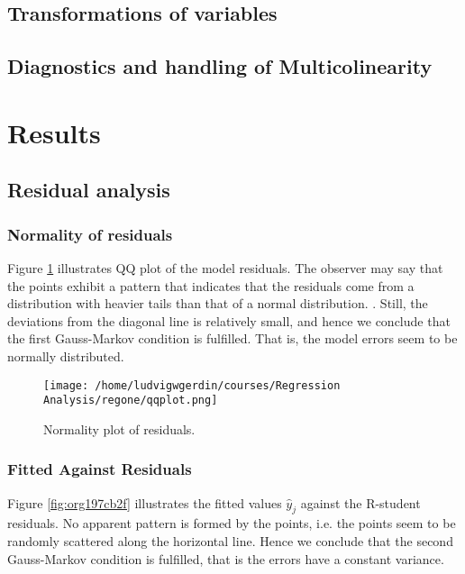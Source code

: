 \documentclass[11pt]{article}
\begin{document}
\subsection{Transformations of variables}
\label{sec:org1f4ca7a}
\subsection{Diagnostics and handling of Multicolinearity}
\label{sec:orgd0df767}
\section{Results}
\label{sec:org0de31e0}
\subsection{Residual analysis}
\label{sec:org2b11afc}
\subsubsection{Normality of residuals}
\label{sec:org24534a4}

Figure \ref{fig:orgabb24cd} illustrates QQ plot of the model residuals. The observer may say that the 
points exhibit a pattern that indicates that the residuals come from a distribution with heavier tails
than that of a normal distribution. 
\cite{Montgomery2012}. Still, the deviations from the diagonal line is relatively small, and hence
we conclude that the first Gauss-Markov condition is fulfilled. That is, the model errors seem to be 
normally distributed.

\begin{figure}[htbp]
\centering
\texttt{[image: /home/ludvigwgerdin/courses/Regression Analysis/regone/qqplot.png]}
\caption{\label{fig:orgabb24cd}
Normality plot of residuals.}
\end{figure}

\subsubsection{Fitted Against Residuals}
\label{sec:org4c84911}

Figure \ref{fig:org197cb2f} illustrates the fitted values \(\hat y_j\) against the R-student residuals. No apparent 
pattern is formed by the points, i.e. the points seem to be randomly scattered along the horizontal line.
Hence we conclude that the second Gauss-Markov condition is fulfilled, that is the errors have a constant 
variance.
\end{document}
